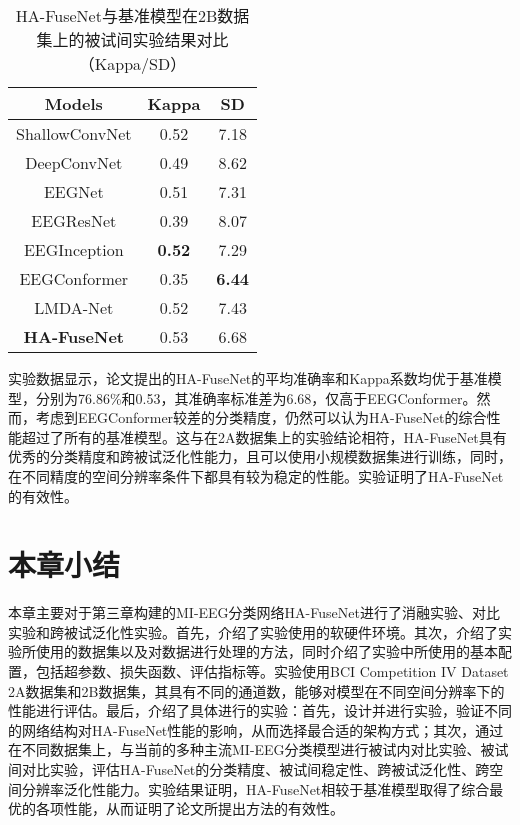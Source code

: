 \begin{table}[H]
    \centering
    \caption{HA-FuseNet与基准模型在2B数据集上的被试间实验结果对比（Kappa/SD）}
    \label{tab:2bcomparecrosssd}
    \begin{tabularx}{\textwidth}{CCC}
      \toprule
      Models & Kappa & SD \\
      \midrule
      ShallowConvNet\cite{schirrmeister2017deep} &0.52&7.18\\
      DeepConvNet\cite{schirrmeister2017deep} &0.49& 8.62 \\
      EEGNet\cite{lawhern2018eegnet} &0.51& 7.31\\
      EEGResNet\cite{HBM:HBM23730} &0.39 &8.07\\
      EEGInception\cite{zhang2021eeg} & \textbf{0.52} &7.29 \\
      EEGConformer\cite{song2022eeg} &0.35 &\textbf{6.44}\\
      LMDA-Net\cite{miao2023lmda} &0.52&7.43\\
      \midrule 
      \textbf{HA-FuseNet} &0.53&6.68\\
      \bottomrule
    \end{tabularx}
\end{table}

实验数据显示，论文提出的HA-FuseNet的平均准确率和Kappa系数均优于基准模型，分别为76.86\%和0.53，其准确率标准差为6.68，仅高于EEGConformer。然而，考虑到EEGConformer较差的分类精度，仍然可以认为HA-FuseNet的综合性能超过了所有的基准模型。这与在2A数据集上的实验结论相符，HA-FuseNet具有优秀的分类精度和跨被试泛化性能力，且可以使用小规模数据集进行训练，同时，在不同精度的空间分辨率条件下都具有较为稳定的性能。实验证明了HA-FuseNet的有效性。

\section{本章小结}

本章主要对于第三章构建的MI-EEG分类网络HA-FuseNet进行了消融实验、对比实验和跨被试泛化性实验。首先，介绍了实验使用的软硬件环境。其次，介绍了实验所使用的数据集以及对数据进行处理的方法，同时介绍了实验中所使用的基本配置，包括超参数、损失函数、评估指标等。实验使用BCI Competition IV Dataset 2A数据集和2B数据集，其具有不同的通道数，能够对模型在不同空间分辨率下的性能进行评估。最后，介绍了具体进行的实验：首先，设计并进行实验，验证不同的网络结构对HA-FuseNet性能的影响，从而选择最合适的架构方式；其次，通过在不同数据集上，与当前的多种主流MI-EEG分类模型进行被试内对比实验、被试间对比实验，评估HA-FuseNet的分类精度、被试间稳定性、跨被试泛化性、跨空间分辨率泛化性能力。实验结果证明，HA-FuseNet相较于基准模型取得了综合最优的各项性能，从而证明了论文所提出方法的有效性。